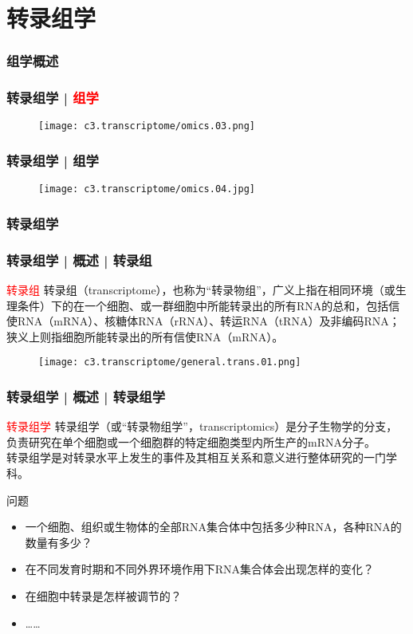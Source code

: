 \section{转录组学}

\subsubsection{组学概述}
\begin{frame}
  \frametitle{转录组学 | \textcolor{red}{组学}}
  \begin{figure}
    \centering
    \texttt{[image: c3.transcriptome/omics.03.png]}
  \end{figure}
\end{frame}

\begin{frame}
  \frametitle{转录组学 | 组学}
  \begin{figure}
    \centering
    \texttt{[image: c3.transcriptome/omics.04.jpg]}
  \end{figure}
\end{frame}

\subsubsection{转录组学}
\begin{frame}
  \frametitle{转录组学 | 概述 | 转录组}
  \begin{block}{\textcolor{red}{转录组}}
转录组（transcriptome），也称为“转录物组”，广义上指在相同环境（或生理条件）下的在一个细胞、或一群细胞中所能转录出的所有RNA的总和，包括信使RNA（mRNA）、核糖体RNA（rRNA）、转运RNA（tRNA）及非编码RNA；狭义上则指细胞所能转录出的所有信使RNA（mRNA）。
  \end{block}
  \begin{figure}
    \centering
    \texttt{[image: c3.transcriptome/general.trans.01.png]}
  \end{figure}
\end{frame}

\begin{frame}
  \frametitle{转录组学 | 概述 | 转录组学}
  \begin{block}{\textcolor{red}{转录组学}}
转录组学（或“转录物组学”，transcriptomics）是分子生物学的分支，负责研究在单个细胞或一个细胞群的特定细胞类型内所生产的mRNA分子。\\
    \vspace{0.5em}
    转录组学是对转录水平上发生的事件及其相互关系和意义进行整体研究的一门学科。
  \end{block}
  \pause
  \begin{block}{问题}
    \begin{itemize}
      \item 一个细胞、组织或生物体的全部RNA集合体中包括多少种RNA，各种RNA的数量有多少？
      \item 在不同发育时期和不同外界环境作用下RNA集合体会出现怎样的变化？
      \item 在细胞中转录是怎样被调节的？
      \item ……
    \end{itemize}
  \end{block}
\end{frame}

